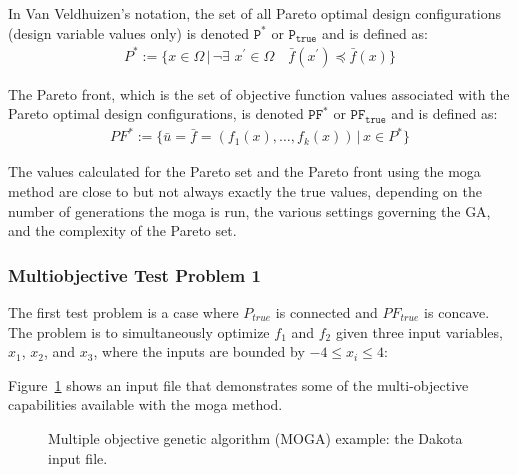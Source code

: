 In Van Veldhuizen's notation, the set of all Pareto optimal design
configurations (design variable values only) is denoted $\mathtt{P^*}$
or $\mathtt{P_{true}}$ and is defined as:
\begin{eqnarray*}
  P^*:=\{x\in\Omega\,|\,\neg\exists\,\,
  x^\prime\in\Omega\quad\bar{f}(x^\prime)\preceq\bar{f}(x)\}
\end{eqnarray*}
 
The Pareto front, which is the set of objective function values
associated with the Pareto optimal design configurations, is denoted
$\mathtt{PF^*}$ or $\mathtt{PF_{true}}$ and is defined as:
\begin{eqnarray*}
  PF^*:=\{\bar{u}=\bar{f}=(f_1(x),\ldots,f_k(x))\,|\, x\in P^*\}
\end{eqnarray*}
 
The values calculated for the Pareto set and the Pareto front using
the moga method are close to but not always exactly the true values,
depending on the number of generations the moga is run, the various
settings governing the GA, and the complexity of the Pareto set.

\subsubsection{Multiobjective Test Problem 1}\label{additional:multiobjective:problem1}
 
The first test problem is a case where $P_{true}$ is connected and
$PF_{true}$ is concave. The problem is to simultaneously optimize
$f_1$ and $f_2$ given three input variables, $x_1$, $x_2$, and
$x_3$, where the inputs are bounded by $-4 \leq x_{i} \leq 4$:
 
Figure~\ref{additional:moga1inp} shows an input file that
demonstrates some of the multi-objective capabilities available with
the moga method.
\begin{figure}[htp!]
  \centering
  \begin{bigbox}
    \begin{small}
    \end{small}
  \end{bigbox}
  \caption{Multiple objective genetic algorithm (MOGA) example: the
    Dakota input file.}
  \label{additional:moga1inp}
\end{figure}
 

